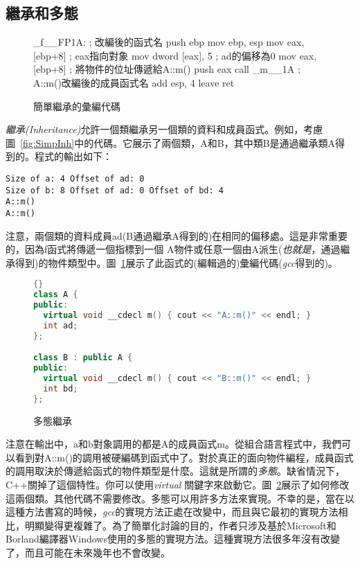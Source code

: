 \subsection{繼承和多態}


\begin{figure}[tp]
\begin{AsmCodeListing}
_f__FP1A:                       ; 改編後的函式名
      push   ebp
      mov    ebp, esp
      mov    eax, [ebp+8]       ; eax指向對象
      mov    dword [eax], 5     ; ad的偏移為0
      mov    eax, [ebp+8]       ; 將物件的位址傳遞給A::m()
      push   eax
      call   _m__1A             ; A::m()改編後的成員函式名
      add    esp, 4
      leave
      ret
\end{AsmCodeListing}
\caption{簡單繼承的彙編代碼 \label{fig:FAsm1}}
\end{figure}

\emph{繼承(Inheritance)}允許一個類繼承另一個類的資料和成員函式。例如，考慮圖~\ref{fig:SimpInh}中的代碼。它展示了兩個類，{\code A}和{\code B}，其中類{\code B}是通過繼承類{\code A}得到的。程式的輸出如下：
\begin{verbatim}
Size of a: 4 Offset of ad: 0
Size of b: 8 Offset of ad: 0 Offset of bd: 4
A::m()
A::m()
\end{verbatim}
注意，兩個類的資料成員{\code ad}({\code B}通過繼承{\code A}得到的)在相同的偏移處。這是非常重要的，因為{\code f}函式將傳遞一個指標到一個
{\code A}物件或任意一個由{\code A}派生(\emph{也就是}，通過繼承得到)的物件類型中。圖~\ref{fig:FAsm1}展示了此函式的(編輯過的)彙編代碼(\emph{gcc}得到的)。

\begin{figure}[tp]
\begin{lstlisting}[language=C++, frame=tlrb]{}
class A {
public:
  virtual void __cdecl m() { cout << "A::m()" << endl; }
  int ad;
};

class B : public A {
public:
  virtual void __cdecl m() { cout << "B::m()" << endl; }
  int bd;
};
\end{lstlisting}
\caption{ 多態繼承 \label{fig:VirtInh}}
\end{figure}

注意在輸出中，{\code a}和{\code b}對象調用的都是{\code A}的成員函式{\code m}。從組合語言程式中，我們可以看到對{\code A::m()}的調用被硬編碼到函式中了。對於真正的面向物件編程，成員函式的調用取決於傳遞給函式的物件類型是什麼。這就是所謂的\emph{多態}。缺省情況下，C++關掉了這個特性。你可以使用\emph{virtual} 關鍵字來啟動它。圖~\ref{fig:VirtInh}展示了如何修改這兩個類。其他代碼不需要修改。多態可以用許多方法來實現。不幸的是，當在以這種方法書寫的時候，\emph{gcc}的實現方法正處在改變中，而且與它最初的實現方法相比，明顯變得更複雜了。為了簡單化討論的目的，作者只涉及基於Microsoft和Borland編譯器Windows使用的多態的實現方法。這種實現方法很多年沒有改變了，而且可能在未來幾年也不會改變。

